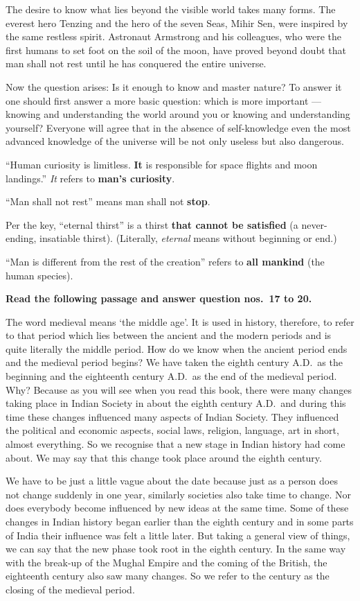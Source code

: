 The desire to know what lies beyond the visible world takes many forms. The everest hero Tenzing and the hero of the seven Seas, Mihir Sen, were inspired by the same restless spirit. Astronaut Armstrong and his colleagues, who were the first humans to set foot on the soil of the moon, have proved beyond doubt that man shall not rest until he has conquered the entire universe.

Now the question arises: Is it enough to know and master nature? To answer it one should first answer a more basic question: which is more important --- knowing and understanding the world around you or knowing and understanding yourself? Everyone will agree that in the absence of self-knowledge even the most advanced knowledge of the universe will be not only useless but also dangerous.

``Human curiosity is limitless. \textbf{It} is responsible for space flights and moon landings.'' \emph{It} refers to \textbf{man's curiosity}.

``Man shall not rest'' means man shall not \textbf{stop}.

Per the key, ``eternal thirst'' is a thirst \textbf{that cannot be satisfied} (a never-ending, insatiable thirst). (Literally, \emph{eternal} means without beginning or end.)

``Man is different from the rest of the creation'' refers to \textbf{all mankind} (the human species).

\textbf{Read the following passage and answer question nos.~17 to 20.}\par\smallskip
The word medieval means `the middle age'. It is used in history, therefore, to refer to that period which lies between the ancient and the modern periods and is quite literally the middle period. How do we know when the ancient period ends and the medieval period begins? We have taken the eighth century A.D.\ as the beginning and the eighteenth century A.D.\ as the end of the medieval period. Why? Because as you will see when you read this book, there were many changes taking place in Indian Society in about the eighth century A.D.\ and during this time these changes influenced many aspects of Indian Society. They influenced the political and economic aspects, social laws, religion, language, art in short, almost everything. So we recognise that a new stage in Indian history had come about. We may say that this change took place around the eighth century.

We have to be just a little vague about the date because just as a person does not change suddenly in one year, similarly societies also take time to change. Nor does everybody become influenced by new ideas at the same time. Some of these changes in Indian history began earlier than the eighth century and in some parts of India their influence was felt a little later. But taking a general view of things, we can say that the new phase took root in the eighth century. In the same way with the break-up of the Mughal Empire and the coming of the British, the eighteenth century also saw many changes. So we refer to the century as the closing of the medieval period.

